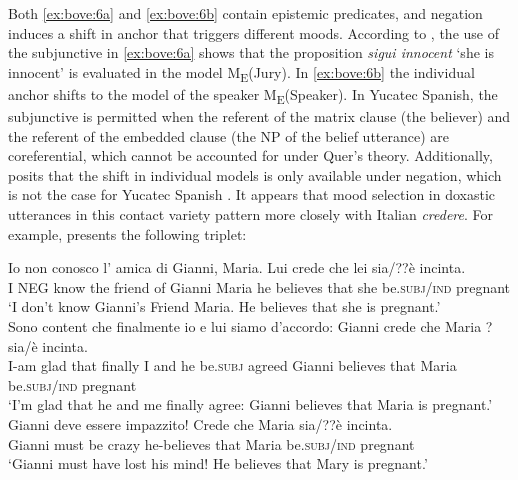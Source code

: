 \documentclass[output=paper,colorlinks,citecolor=brown,
]{langscibook}
\begin{document}
Both \ref{ex:bove:6a} and \ref{ex:bove:6b} contain epistemic predicates, and negation induces a shift in anchor that triggers different moods. According to \citet{quer1998}, the use of the subjunctive in \ref{ex:bove:6a} shows that the proposition \textit{sigui innocent }`she is innocent' is evaluated in the model M\textsubscript{E}(Jury). In \ref{ex:bove:6b} the individual anchor shifts to the model of the speaker M\textsubscript{E}(Speaker). In Yucatec Spanish, the subjunctive is permitted when the referent of the matrix clause (the believer) and the referent of the embedded clause (the NP of the belief utterance) are coreferential, which cannot be accounted for under Quer's theory. Additionally, \citet{quer1998,Quer2001} posits that the shift in individual models is only available under negation, which is not the case for Yucatec Spanish \citep{Bove2020}. It appears that mood selection in doxastic utterances in this contact variety pattern more closely with Italian \textit{credere}. For example, \citet[23]{Homer2007} presents the following triplet:



\begin{exe} %
    \ex\label{ex:bove:7} 
    \begin{xlist} %
        \ex \label{ex:bove:7a} 
            \gll  Io non conosco l' amica di Gianni, Maria. Lui crede che lei sia/??è incinta.\\  
           I NEG know the friend of Gianni Maria he believes that she be.\textsc{subj}/\textsc{ind} pregnant\\%
                   \glt `I don't know Gianni's Friend Maria. He believes that she is pregnant.'\\
        \ex\label{ex:bove:7b}
            \gll  Sono content che finalmente io e lui siamo d'accordo: Gianni crede che Maria ?sia/è incinta.\\
           I-am glad that finally I and he be.\textsc{subj} agreed Gianni believes that Maria be.\textsc{subj}/\textsc{ind} pregnant\\
                   \glt `I'm glad that he and me finally agree: Gianni believes that Maria is pregnant.'\\
          \ex\label{ex:bove:7c}
                   \gll Gianni deve essere impazzito! Crede che Maria sia/??è incinta.\\
                   Gianni must be crazy he-believes that Maria be.\textsc{subj}/\textsc{ind} pregnant \\
                   `Gianni must have lost his mind! He believes that Mary is pregnant.'
\end{xlist}
\end{exe}
\newpage
\end{document}
